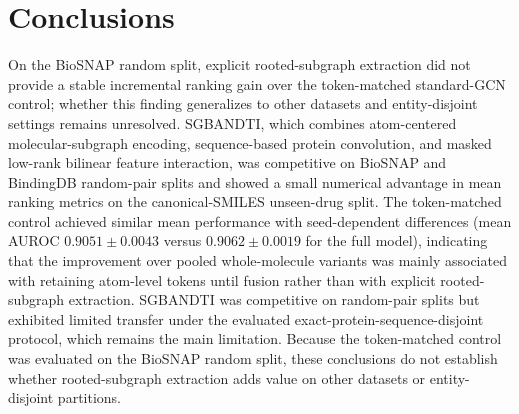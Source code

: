 \documentclass[computers,article,submit,moreauthors]{Definitions/mdpi}
\begin{document}
\section{Conclusions}
On the BioSNAP random split, explicit rooted-subgraph extraction did not provide a stable incremental ranking gain over the token-matched standard-GCN control; whether this finding generalizes to other datasets and entity-disjoint settings remains unresolved. SGBANDTI, which combines atom-centered molecular-subgraph encoding, sequence-based protein convolution, and masked low-rank bilinear feature interaction, was competitive on BioSNAP and BindingDB random-pair splits and showed a small numerical advantage in mean ranking metrics on the canonical-SMILES unseen-drug split. The token-matched control achieved similar mean performance with seed-dependent differences (mean AUROC $0.9051 \pm 0.0043$ versus $0.9062 \pm 0.0019$ for the full model), indicating that the improvement over pooled whole-molecule variants was mainly associated with retaining atom-level tokens until fusion rather than with explicit rooted-subgraph extraction. SGBANDTI was competitive on random-pair splits but exhibited limited transfer under the evaluated exact-protein-sequence-disjoint protocol, which remains the main limitation. Because the token-matched control was evaluated on the BioSNAP random split, these conclusions do not establish whether rooted-subgraph extraction adds value on other datasets or entity-disjoint partitions.



\end{document}
